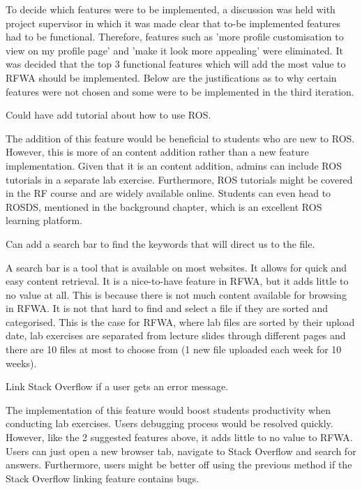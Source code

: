\documentclass{l4proj}
\begin{document}
To decide which features were to be implemented, a discussion was held with project supervisor in which it was made clear that to-be implemented features had to be functional. Therefore, features such as 'more profile customisation to view on my profile page' and 'make it look more appealing' were eliminated. It was decided that the top 3 functional features which will add the most value to RFWA should be implemented. Below are the justifications as to why certain features were not chosen and some were to be implemented in the third iteration.

\begin{center}
    Could have add tutorial about how to use ROS.
\end{center}

The addition of this feature would be beneficial to students who are new to ROS. However, this is more of an content addition rather than a new feature implementation. Given that it is an content addition, admins can include ROS tutorials in a separate lab exercise. Furthermore, ROS tutorials might be covered in the RF course and are widely available online. Students can even head to ROSDS, mentioned in the background chapter, which is an excellent ROS learning platform.

\begin{center}
    Can add a search bar to find the keywords that will direct us to the file.
\end{center}

A search bar is a tool that is available on most websites. It allows for quick and easy content retrieval. It is a nice-to-have feature in RFWA, but it adds little to no value at all. This is because there is not much content available for browsing in RFWA. It is not that hard to find and select a file if they are sorted and categorised. This is the case for RFWA, where lab files are sorted by their upload date, lab exercises are separated from lecture slides through different pages and there are 10 files at most to choose from (1 new file uploaded each week for 10 weeks).

\begin{center}
    Link Stack Overflow if a user gets an error message.
\end{center}

The implementation of this feature would boost students productivity when conducting lab exercises. Users debugging process would be resolved quickly. However, like the 2 suggested features above, it adds little to no value to RFWA. Users can just open a new browser tab, navigate to Stack Overflow and search for answers. Furthermore, users might be better off using the previous method if the Stack Overflow linking feature contains bugs. 
\end{document}
